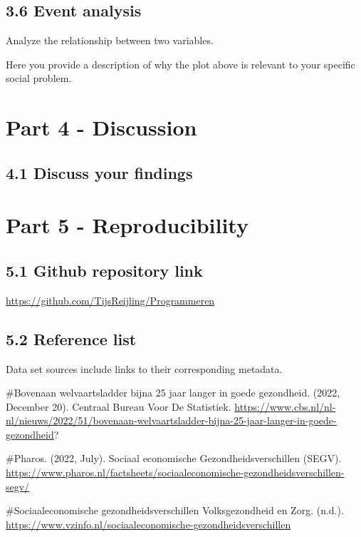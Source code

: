 \documentclass[
]{article}
\begin{document}
\subsection{3.6 Event analysis}\label{event-analysis}

Analyze the relationship between two variables.

Here you provide a description of why the plot above is relevant to your
specific social problem.

\section{Part 4 - Discussion}\label{part-4---discussion}

\subsection{4.1 Discuss your findings}\label{discuss-your-findings}

\section{Part 5 - Reproducibility}\label{part-5---reproducibility}

\subsection{5.1 Github repository link}\label{github-repository-link}

\url{https://github.com/TijsReijling/Programmeren}

\subsection{5.2 Reference list}\label{reference-list}

Data set sources include links to their corresponding metadata.

\#Bovenaan welvaartsladder bijna 25 jaar langer in goede gezondheid.
(2022, December 20). Centraal Bureau Voor De Statistiek.
\url{https://www.cbs.nl/nl-nl/nieuws/2022/51/bovenaan-welvaartsladder-bijna-25-jaar-langer-in-goede-gezondheid}?

\#Pharos. (2022, July). Sociaal economische Gezondheidsverschillen
(SEGV).
\url{https://www.pharos.nl/factsheets/sociaaleconomische-gezondheidsverschillen-segv/}

\#Sociaaleconomische gezondheidsverschillen \textbar{} Volksgezondheid
en Zorg. (n.d.).
\url{https://www.vzinfo.nl/sociaaleconomische-gezondheidsverschillen}
\end{document}
